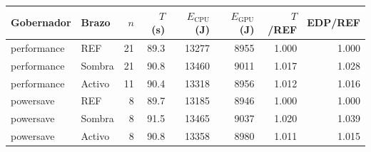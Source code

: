 \begin{tabular}{@{}llrrrrrr@{}}
\toprule
\textbf{Gobernador} & \textbf{Brazo} & \textbf{$n$} & \textbf{$T$ (s)} & \textbf{$E_{\mathrm{CPU}}$ (J)} & \textbf{$E_{\mathrm{GPU}}$ (J)} & \textbf{$T$/REF} & \textbf{EDP/REF} \\
\midrule
performance & REF & 21 & 89.3 & 13277 & 8955 & 1.000 & 1.000 \\
performance & Sombra & 21 & 90.8 & 13460 & 9011 & 1.017 & 1.028 \\
performance & Activo & 11 & 90.4 & 13318 & 8956 & 1.012 & 1.016 \\
\midrule
powersave & REF & 8 & 89.7 & 13185 & 8946 & 1.000 & 1.000 \\
powersave & Sombra & 8 & 91.5 & 13465 & 9037 & 1.020 & 1.039 \\
powersave & Activo & 8 & 90.8 & 13358 & 8980 & 1.011 & 1.015 \\
\bottomrule
\end{tabular}
